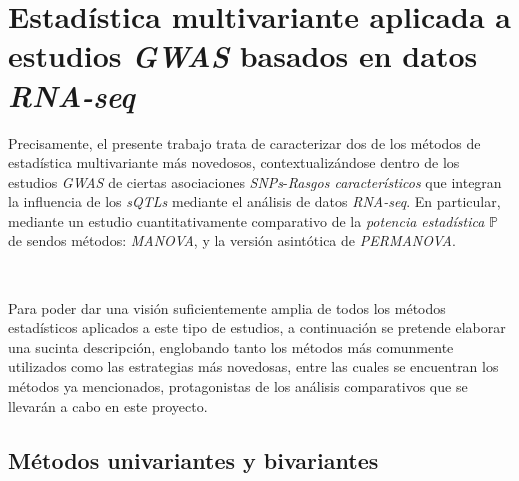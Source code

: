 \documentclass[IB,BIB]{TFUOC}%
\begin{document}


\section{Estadística multivariante aplicada a estudios \textit{GWAS} basados en datos \textit{RNA-seq}}
\label{sec:Estadística multivariante aplicada a estudios GWAS basados en datos RNA-seq}

Precisamente, el presente trabajo trata de caracterizar dos de los métodos de estadística multivariante más novedosos, contextualizándose dentro de los estudios \textit{GWAS} de ciertas asociaciones \textit{SNPs}-\textit{Rasgos característicos} que integran la influencia de los \textit{sQTLs} mediante el análisis de datos \textit{RNA-seq}. En particular, mediante un estudio cuantitativamente comparativo de la \textit{potencia estadística} \( \mathbb P \) de sendos métodos: \textit{MANOVA}, y la versión asintótica de \textit{PERMANOVA}.

\

Para poder dar una visión suficientemente amplia de todos los métodos estadísticos aplicados a este tipo de estudios, a continuación se pretende elaborar una sucinta descripción, englobando tanto los métodos más comunmente utilizados como las estrategias más novedosas, entre las cuales se encuentran los métodos ya mencionados, protagonistas de los análisis comparativos que se llevarán a cabo en este proyecto.


\subsection{Métodos univariantes y bivariantes}
\label{sec:Métodos univariantes y bivariantes}
\end{document}
